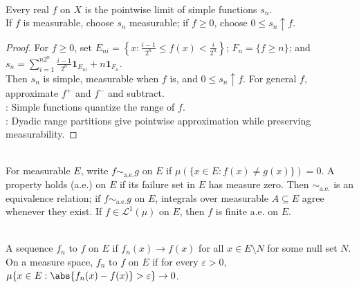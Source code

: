 \begin{theorem} \label{thm:simple-approximation-measurable-functions} \\
Every real $f$ on $X$ is the pointwise limit of simple functions $s_n$.\\
If $f$ is measurable, choose $s_n$ measurable; if $f\geq0$, choose $0\leq s_n\uparrow f$.
\begin{proof}
For $f\geq0$, set $E_{ni}=\left\{x:\frac{i-1}{2^n}\leq f(x)<\frac{i}{2^n}\right\}$; $F_n=\{f\geq n\}$; and $s_n=\sum\limits_{i=1}^{n2^n}\frac{i-1}{2^n}\mathbf{1}_{E_{ni}}+n\mathbf{1}_{F_n}$.\\
Then $s_n$ is simple, measurable when $f$ is, and $0\leq s_n\uparrow f$. For general $f$, approximate $f^+$ and $f^-$ and subtract.\\
: Simple functions quantize the range of $f$.\\
: Dyadic range partitions give pointwise approximation while preserving measurability.
\end{proof}
\end{theorem}

\begin{definition} \label{def:almost-everywhere-and-null-set-invariance} \\
For measurable $E$, write $f\sim_{\mathrm{a.e.}}g$ on $E$ if $\mu(\{x\in E:f(x)\neq g(x)\})=0$. A property holds  (a.e.) on $E$ if its failure set in $E$ has measure zero. Then $\sim_{\mathrm{a.e.}}$ is an equivalence relation; if $f\sim_{\mathrm{a.e.}}g$ on $E$, integrals over measurable $A\subseteq E$ agree whenever they exist. If $f\in\mathscr{L}^1(\mu)$ on $E$, then $f$ is finite a.e. on $E$.
\end{definition}

\begin{definition} \label{def:almost-everywhere-and-in-measure-convergence} \\
A sequence $f_n$  to $f$ on $E$ if $f_n(x)\to f(x)$ for all $x\in E\setminus N$ for some null set $N$.\\
On a measure space, $f_n$  to $f$ on $E$ if for every $\varepsilon>0$, $\mu\{x\in E:\abs{f_n(x)-f(x)}>\varepsilon\}\to0$.
\end{definition}

